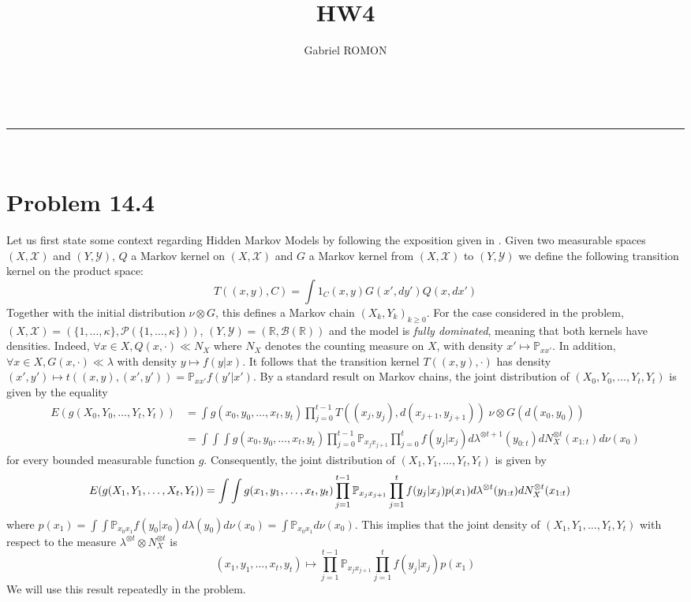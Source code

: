 \documentclass[a4paper,11pt, hidelinks]{article}
\makeatletter
\newcommand{\linia}{\rule{\linewidth}{0.5pt}}
\renewcommand{\maketitle}{
\begin{center}
\vspace{2ex}
{\huge \textsc{\@title}}
\vspace{1ex}
\\
\linia\\
\@author 
\vspace{4ex}
\end{center}
}
\makeatother
\begin{document}
\title{HW4}

\author{Gabriel ROMON}



\maketitle
{}
\section*{Problem 14.4}
Let us first state some context regarding Hidden Markov Models by following the exposition given in \cite{book:54642}. Given two measurable spaces $(X,\mathcal X)$ and $(Y,\mathcal Y)$, $Q$ a Markov kernel on $(X,\mathcal X)$ and $G$ a Markov kernel from $(X,\mathcal X)$ to $(Y,\mathcal Y)$ we define the following transition kernel on the product space: $$T((x,y),C) = \int 1_C(x,y) G(x',dy')Q(x,dx')$$ Together with the initial distribution $\nu \otimes G$, this defines a Markov chain $(X_k,Y_k)_{k\geq 0}$.\newline
For the case considered in the problem, $(X,\mathcal X)=(\{1,\ldots,\kappa\}, \mathcal P(\{1,\ldots,\kappa\}))$, $(Y,\mathcal Y) = (\mathbb R, \mathcal B(\mathbb R))$ and the model is \textit{fully dominated}, meaning that both kernels have densities. Indeed, $\forall x\in X, Q(x,\cdot) \ll N_X$ where $N_X$ denotes the counting measure on $X$, with density $x'\mapsto \mathbb P_{xx'}$. In addition, $\forall x\in X, G(x,\cdot)\ll \lambda$ with density $y\mapsto f(y|x)$. \newline It follows that the transition kernel $T((x,y),\cdot)$ has density $(x',y')\mapsto t((x,y),(x',y')) = \mathbb P_{xx'}f(y'|x')$.\newline
By a standard result on Markov chains, the joint distribution of $(X_0,Y_0,\ldots, Y_t,Y_t)$ is given by the equality $$\begin{aligned}E(g(X_0,Y_0,\ldots, Y_t,Y_t)) 
&= \int g(x_0,y_0,\ldots,x_t,y_t) \prod_{j=0}^{t-1} T((x_{j},y_{j}),d(x_{j+1},y_{j+1})) \;\nu \otimes G(d(x_0,y_0))\\
&= \int \int \int g(x_0,y_0,\ldots,x_t,y_t) \prod_{j=0}^{t-1} \mathbb P_{x_{j} x_{j+1}} \prod_{j=0}^t f(y_j|x_j) d\lambda^{\otimes t+1}(y_{0:t}) dN_X^{\otimes t}(x_{1:t}) d\nu(x_0)
 \end{aligned}$$
for every bounded measurable function $g$. Consequently, the joint distribution of $(X_1,Y_1,\ldots, Y_t,Y_t)$ is given by 
$$\hspace{-1cm}E(g(X_1,Y_1,\ldots, X_t,Y_t)) = \int \int g(x_1,y_1,\ldots,x_t,y_t) \prod_{j=1}^{t-1}\mathbb P_{x_{j} x_{j+1}} \prod_{j=1}^{t}f(y_j|x_j) p(x_1)d\lambda^{\otimes t}(y_{1:t}) dN_X^{\otimes t}(x_{1:t})$$
where $p(x_1) = \int \int \mathbb P_{x_0 x_1} f(y_0|x_0)d\lambda(y_0)d\nu(x_0)=\int \mathbb P_{x_0 x_1} d\nu(x_0)$.\newline
This implies that the joint density of $(X_1,Y_1,\ldots, Y_t,Y_t)$ with respect to the measure $\lambda^{\otimes t} \otimes N_X^{\otimes t}$ is $$(x_1,y_1,\ldots, x_t,y_t) \mapsto \prod_{j=1}^{t-1}\mathbb P_{x_{j} x_{j+1}} \prod_{j=1}^{t}f(y_j|x_j) p(x_1)$$
We will use this result repeatedly in the problem.
\end{document}
